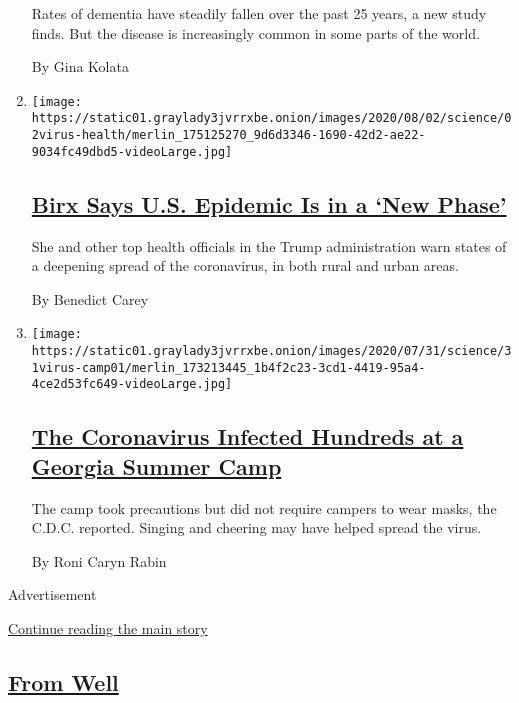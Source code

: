 \begin{enumerate}
  Rates of dementia have steadily fallen over the past 25 years, a new
  study finds. But the disease is increasingly common in some parts of
  the world.

  By Gina Kolata
\item
  \texttt{[image: https://static01.graylady3jvrrxbe.onion/images/2020/08/02/science/02virus-health/merlin\_175125270\_9d6d3346-1690-42d2-ae22-9034fc49dbd5-videoLarge.jpg]}

  \hypertarget{birx-says-us-epidemic-is-in-a-new-phase}{%
  \subsection{\texorpdfstring{\href{/2020/08/02/health/dr-birx-coronavirus-phase.html}{Birx
  Says U.S. Epidemic Is in a `New
  Phase'}}{Birx Says U.S. Epidemic Is in a `New Phase'}}\label{birx-says-us-epidemic-is-in-a-new-phase}}

  She and other top health officials in the Trump administration warn
  states of a deepening spread of the coronavirus, in both rural and
  urban areas.

  By Benedict Carey
\item
  \texttt{[image: https://static01.graylady3jvrrxbe.onion/images/2020/07/31/science/31virus-camp01/merlin\_173213445\_1b4f2c23-3cd1-4419-95a4-4ce2d53fc649-videoLarge.jpg]}

  \hypertarget{the-coronavirus-infected-hundreds-at-a-georgia-summer-camp}{%
  \subsection{\texorpdfstring{\href{/2020/07/31/health/coronavirus-children-camp.html}{The
  Coronavirus Infected Hundreds at a Georgia Summer
  Camp}}{The Coronavirus Infected Hundreds at a Georgia Summer Camp}}\label{the-coronavirus-infected-hundreds-at-a-georgia-summer-camp}}

  The camp took precautions but did not require campers to wear masks,
  the C.D.C. reported. Singing and cheering may have helped spread the
  virus.

  By Roni Caryn Rabin
\end{enumerate}

Advertisement

\protect\hyperlink{after-mid1}{Continue reading the main story}

\hypertarget{from-well}{%
\subsection{\texorpdfstring{\href{/section/well}{From
Well}}{From Well}}\label{from-well}}

